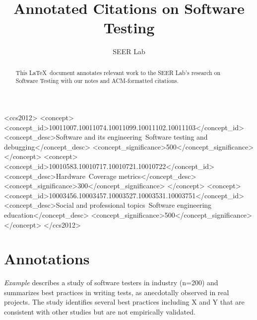 \documentclass[10pt,sigconf]{acmart}
\begin{document}
\title{Annotated Citations on Software Testing}


\author{SEER Lab}

\renewcommand{\shortauthors}{F. Lastname et al.}


\begin{abstract}
This \LaTeX\ document annotates relevant work to the SEER Lab's research on
Software Testing with our notes and ACM-formatted citations.
\end{abstract}

%
%
\begin{CCSXML}
<ccs2012>
   <concept>
       <concept_id>10011007.10011074.10011099.10011102.10011103</concept_id>
       <concept_desc>Software and its engineering~Software testing and debugging</concept_desc>
       <concept_significance>500</concept_significance>
       </concept>
   <concept>
       <concept_id>10010583.10010717.10010721.10010722</concept_id>
       <concept_desc>Hardware~Coverage metrics</concept_desc>
       <concept_significance>300</concept_significance>
       </concept>
   <concept>
       <concept_id>10003456.10003457.10003527.10003531.10003751</concept_id>
       <concept_desc>Social and professional topics~Software engineering education</concept_desc>
       <concept_significance>500</concept_significance>
       </concept>
 </ccs2012>
\end{CCSXML}






\maketitle

\section{Annotations}

\textit{Example}
\cite{lastname-year} describes a study of software testers in industry (n=200)
and summarizes best practices in writing tests, as anecdotally observed in real
projects. The study identifies several best practices including X and Y that are
consistent with other studies \cite{abc} \cite{xyz} but are not empirically
validated.


 
\end{document}
